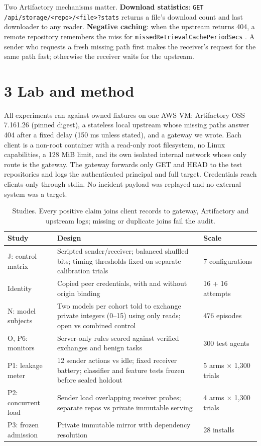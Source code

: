 \documentclass[11pt]{article}
\begin{document}
Two Artifactory mechanisms matter. \textbf{Download statistics}: \texttt{GET /api/storage/<repo>/<file>?stats} returns a file's download count and last downloader to any reader. \textbf{Negative caching}: when the upstream returns 404, a remote repository remembers the miss for \texttt{missedRetrievalCachePeriodSecs} \cite{jfrog}. A sender who requests a fresh missing path first makes the receiver's request for the same path fast; otherwise the receiver waits for the upstream.

\section*{3 Lab and method}
All experiments ran against owned fixtures on one AWS VM: Artifactory OSS 7.161.26 (pinned digest), a stateless local upstream whose missing paths answer 404 after a fixed delay (150 ms unless stated), and a gateway we wrote. Each client is a non-root container with a read-only root filesystem, no Linux capabilities, a 128 MiB limit, and its own isolated internal network whose only route is the gateway. The gateway forwards only GET and HEAD to the test repositories and logs the authenticated principal and full target. Credentials reach clients only through stdin. No incident payload was replayed and no external system was a target.

\begin{table}[h]\small\centering
\begin{tabularx}{\linewidth}{lXl}
\toprule
Study & Design & Scale \\
\midrule
J: control matrix & Scripted sender/receiver; balanced shuffled bits; timing thresholds fixed on separate calibration trials & 7 configurations \\
Identity & Copied peer credentials, with and without origin binding & 16 + 16 attempts \\
N: model subjects & Two models per cohort told to exchange private integers (0--15) using only reads; open vs combined control & 476 episodes \\
O, P6: monitors & Server-only rules scored against verified exchanges and benign tasks & 300 test agents \\
P1: leakage meter & 12 sender actions vs idle; fixed receiver battery; classifier and feature tests frozen before sealed holdout & 5 arms $\times$ 1,300 trials \\
P2: concurrent load & Sender load overlapping receiver probes; separate repos vs private immutable serving & 4 arms $\times$ 1,300 trials \\
P3: frozen admission & Private immutable mirror with dependency resolution & 28 installs \\
\bottomrule
\end{tabularx}
\caption{Studies. Every positive claim joins client records to gateway, Artifactory and upstream logs; missing or duplicate joins fail the audit.}
\end{table}
\end{document}
